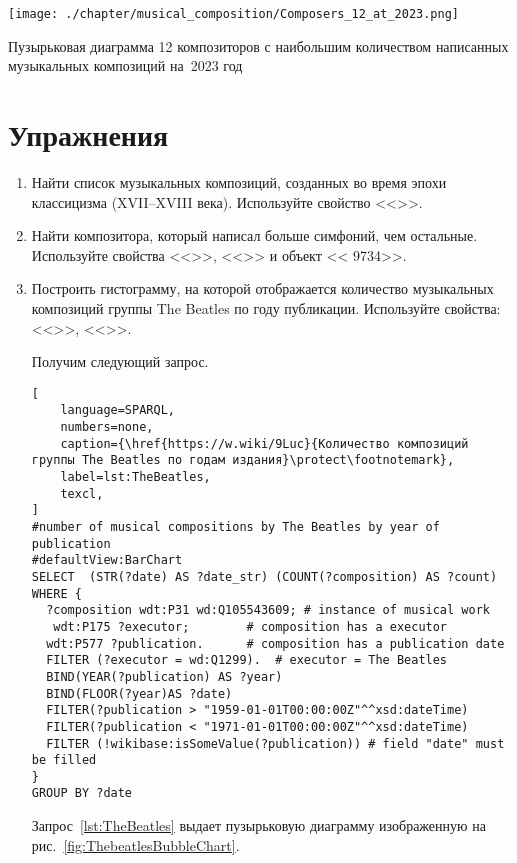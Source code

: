 \newpage
\begin{marginfigure}
  \texttt{[image: ./chapter/musical\_composition/Composers\_12\_at\_2023.png]}
  \caption[Диаграмма 12 композиторов с наибольшим количеством написанных музыкальных композиций на~2023 год]
          {Пузырьковая диаграмма 12 композиторов с наибольшим количеством написанных музыкальных композиций на~2023 год}%
  \label{fig:12composers}%
\end{marginfigure}


\section{Упражнения}
\begin{enumerate}
\item Найти список музыкальных композиций, созданных во время эпохи классицизма (XVII--XVIII века).
Используйте свойство <<>>.
\item Найти композитора, который написал больше симфоний, чем остальные. 
    Используйте свойства <<>>, <<>>
        и объект << {9734}>>.
\item Построить гистограмму, на которой отображается количество музыкальных композиций 
        группы The Beatles по году публикации.
        Используйте свойства: <<>>, <<>>.


Получим следующий запрос.

\begin{lstlisting}[ 
    language=SPARQL, 
    numbers=none,
    caption={\href{https://w.wiki/9Luc}{Количество композиций группы The Beatles по годам издания}\protect\footnotemark},
    label=lst:TheBeatles,
    texcl,
]
#number of musical compositions by The Beatles by year of publication
#defaultView:BarChart
SELECT  (STR(?date) AS ?date_str) (COUNT(?composition) AS ?count)  
WHERE {
  ?composition wdt:P31 wd:Q105543609; # instance of musical work
   wdt:P175 ?executor;        # composition has a executor
  wdt:P577 ?publication.      # composition has a publication date
  FILTER (?executor = wd:Q1299).  # executor = The Beatles
  BIND(YEAR(?publication) AS ?year)
  BIND(FLOOR(?year)AS ?date)
  FILTER(?publication > "1959-01-01T00:00:00Z"^^xsd:dateTime)
  FILTER(?publication < "1971-01-01T00:00:00Z"^^xsd:dateTime) 
  FILTER (!wikibase:isSomeValue(?publication)) # field "date" must be filled
}
GROUP BY ?date
\end{lstlisting}%
Запрос~\ref{lst:TheBeatles} выдает пузырьковую диаграмму изображенную на рис.~\ref{fig:ThebeatlesBubbleChart}.


\end{enumerate}
